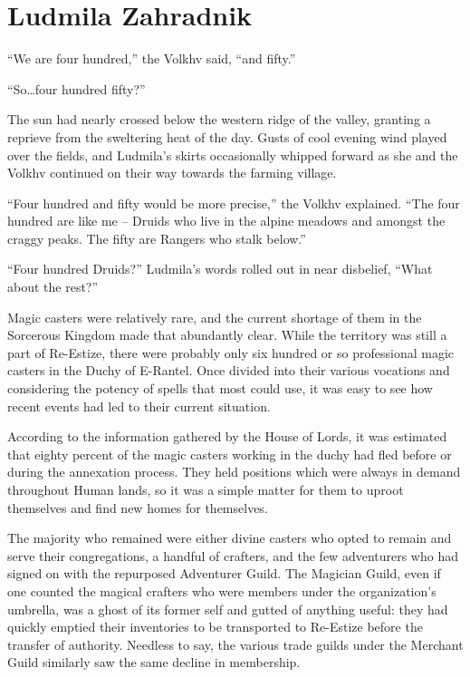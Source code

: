 \chapter{Ludmila Zahradnik}

“We are four hundred,” the Volkhv said, “and fifty.”

 

“So…four hundred fifty?”

 

The sun had nearly crossed below the western ridge of the valley, granting a reprieve from the sweltering heat of the day. Gusts of cool evening wind played over the fields, and Ludmila’s skirts occasionally whipped forward as she and the Volkhv continued on their way towards the farming village.

 

“Four hundred and fifty would be more precise,” the Volkhv explained. “The four hundred are like me – Druids who live in the alpine meadows and amongst the craggy peaks. The fifty are Rangers who stalk below.”

 

“Four hundred Druids?” Ludmila’s words rolled out in near disbelief, “What about the rest?”

 

Magic casters were relatively rare, and the current shortage of them in the Sorcerous Kingdom made that abundantly clear. While the territory was still a part of Re-Estize, there were probably only six hundred or so professional magic casters in the Duchy of E-Rantel. Once divided into their various vocations and considering the potency of spells that most could use, it was easy to see how recent events had led to their current situation.

 

According to the information gathered by the House of Lords, it was estimated that eighty percent of the magic casters working in the duchy had fled before or during the annexation process. They held positions which were always in demand throughout Human lands, so it was a simple matter for them to uproot themselves and find new homes for themselves.

 

The majority who remained were either divine casters who opted to remain and serve their congregations, a handful of crafters, and the few adventurers who had signed on with the repurposed Adventurer Guild. The Magician Guild, even if one counted the magical crafters who were members under the organization’s umbrella, was a ghost of its former self and gutted of anything useful: they had quickly emptied their inventories to be transported to Re-Estize before the transfer of authority. Needless to say, the various trade guilds under the Merchant Guild similarly saw the same decline in membership.


